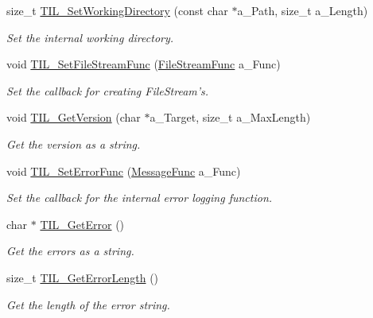 \begin{DoxyCompactItemize}
size\_\-t \hyperlink{namespacetil_a23d6a0255921e477f4f04e27c28c3945}{TIL\_\-SetWorkingDirectory} (const char $\ast$a\_\-Path, size\_\-t a\_\-Length)
\begin{DoxyCompactList}\small\item\em Set the internal working directory. \item\end{DoxyCompactList}\item 
void \hyperlink{namespacetil_a52083ef60545c86742eeb28c3504a60c}{TIL\_\-SetFileStreamFunc} (\hyperlink{namespacetil_ad2bb0fc50e3103fc00335b66adf272c8}{FileStreamFunc} a\_\-Func)
\begin{DoxyCompactList}\small\item\em Set the callback for creating FileStream's. \item\end{DoxyCompactList}\item 
void \hyperlink{namespacetil_ad1f5533b868c2f7f1f9a343642b3ff42}{TIL\_\-GetVersion} (char $\ast$a\_\-Target, size\_\-t a\_\-MaxLength)
\begin{DoxyCompactList}\small\item\em Get the version as a string. \item\end{DoxyCompactList}\item 
void \hyperlink{namespacetil_acf5fe389d33053c01da96da10ef88b0e}{TIL\_\-SetErrorFunc} (\hyperlink{namespacetil_a4cd3def0937f0e817958cdcc44241549}{MessageFunc} a\_\-Func)
\begin{DoxyCompactList}\small\item\em Set the callback for the internal error logging function. \item\end{DoxyCompactList}\item 
char $\ast$ \hyperlink{namespacetil_a194b32071f97f5607de361743f895c54}{TIL\_\-GetError} ()
\begin{DoxyCompactList}\small\item\em Get the errors as a string. \item\end{DoxyCompactList}\item 
size\_\-t \hyperlink{namespacetil_acee705152b244eb9f8efc5ed8aea744e}{TIL\_\-GetErrorLength} ()
\begin{DoxyCompactList}\small\item\em Get the length of the error string. \item\end{DoxyCompactList}\item 

\end{DoxyCompactItemize}
